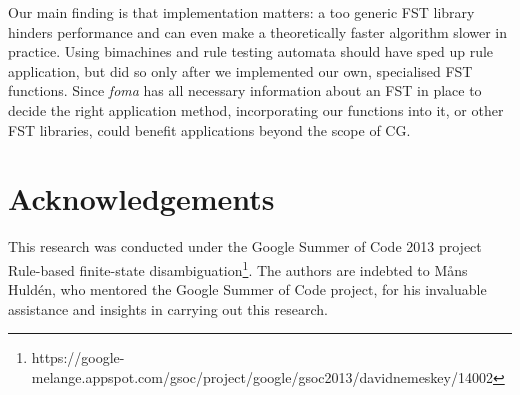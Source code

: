 \documentclass[11pt]{article}
\begin{document}
Our main finding is that implementation matters: a too generic FST library
hinders performance and can even make a theoretically faster algorithm slower
in practice. Using bimachines and rule testing automata should have sped up
rule application, but did so only after we implemented our own, specialised
FST functions. Since \emph{foma} has all necessary information about an FST in
place to decide the right application method, incorporating our functions into
it, or other FST libraries, could benefit applications beyond the scope of CG.


\section*{Acknowledgements}
This research was conducted under the Google Summer of Code 2013 project
Rule-based finite-state disambiguation\footnote{
https://google-melange.appspot.com/gsoc/project/google/gsoc2013/davidnemeskey/14002}. 
The authors are indebted to Måns Huldén, who mentored the Google Summer of Code project, for his invaluable 
assistance and insights in carrying out this research.



\end{document}
